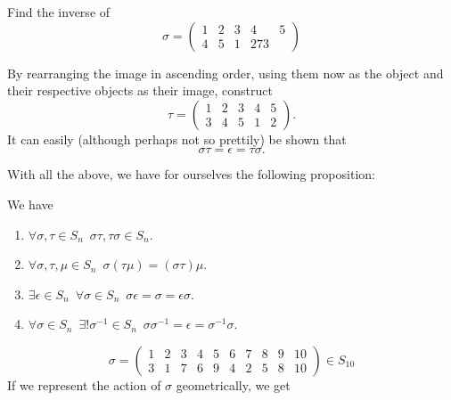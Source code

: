 \documentclass[notoc,notitlepage]{tufte-book}
\begin{document}
\begin{eg}
  \label{eg:inverse_permutation}
  Find the inverse of
  \begin{equation*}
    \sigma = \begin{pmatrix}
      1 & 2 & 3 & 4 & 5 \\
      4 & 5 & 1 & 2 7 3
    \end{pmatrix}
  \end{equation*}

  \begin{solution}
    By rearranging the image in ascending order, using them now as the object and their respective objects as their image, construct
    \begin{equation*}
      \tau = \begin{pmatrix}
        1 & 2 & 3 & 4 & 5 \\
        3 & 4 & 5 & 1 & 2
      \end{pmatrix}.
    \end{equation*}
    It can easily (although perhaps not so prettily) be shown that
    \begin{equation*}
      \sigma \tau = \epsilon = \tau \sigma.
    \end{equation*}
  \end{solution}
\end{eg}

With all the above, we have for ourselves the following proposition:

\begin{propo}[Properties of $S_n$]\label{propo:properties_of_Sn}
  We have
  \begin{enumerate}
    \item $\forall \sigma, \tau \in S_n \enspace \sigma \tau, \tau \sigma \in S_n$.
    \item $\forall \sigma, \tau, \mu \in S_n \enspace \sigma (\tau \mu) = (\sigma \tau) \mu$.
    \item $\exists \epsilon \in S_n \enspace \forall \sigma \in S_n \enspace \sigma \epsilon = \sigma = \epsilon \sigma$.
    \item $\forall \sigma \in S_n \enspace \exists! \sigma^{-1} \in S_n \enspace \sigma \sigma^{-1} = \epsilon = \sigma^{-1} \sigma$.
  \end{enumerate}
\end{propo}

\begin{equation*}
  \sigma = \begin{pmatrix}
    1 & 2 & 3 & 4 & 5 & 6 & 7 & 8 & 9 & 10 \\
    3 & 1 & 7 & 6 & 9 & 4 & 2 & 5 & 8 & 10
  \end{pmatrix} \in S_{10}
\end{equation*}
If we represent the action of $\sigma$ geometrically, we get
\end{document}
